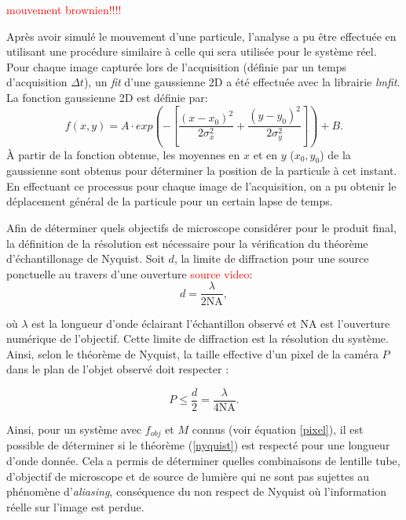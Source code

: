 \documentclass[conference]{IEEEtran}
\begin{document}
\textcolor{red}{mouvement brownien!!!!}

Après avoir simulé le mouvement d'une particule, l'analyse a pu être effectuée en utilisant une procédure similaire
à celle qui sera utilisée pour le système réel. Pour chaque image capturée lors de l'acquisition (définie par un temps d'acquisition $\Delta t$), un \textit{fit}
d'une gaussienne 2D a été effectuée avec la librairie \textit{lmfit}. La fonction gaussienne 2D est définie par:
\begin{equation}
  f(x,y)=A\cdot exp\left(-\left[\frac{(x-x_0)^2}{2\sigma_x^2}+\frac{(y-y_0)^2}{2\sigma_y^2}\right]\right)+B.
\end{equation}
À partir de la fonction obtenue, les moyennes en $x$ et en $y$ ($x_0,y_0$) de la gaussienne sont obtenus
pour déterminer la position de la particule à cet instant. En effectuant ce processus pour chaque image de l'acquisition,
on a pu obtenir le déplacement général de la particule pour un certain lapse de temps.

Afin de déterminer quels objectifs de microscope considérer pour le produit final, la définition
de la résolution est nécessaire pour la vérification du théorème d'échantillonage de Nyquist. Soit $d$,
la limite de diffraction pour une source ponctuelle au travers d'une ouverture \textcolor{red}{source video}:
\begin{equation}
  d = \frac{\lambda}{2 \text{NA}},
\end{equation}

où $\lambda$ est la longueur d'onde éclairant l'échantillon observé et NA est l'ouverture numérique de
l'objectif. Cette limite de diffraction est la résolution du système. Ainsi, selon le théorème
de Nyquist, la taille effective d'un pixel de la caméra $P$ dans le plan de l'objet observé doit respecter :

\begin{equation}\label{nyquist}
  P \leq \frac{d}{2} = \frac{\lambda}{4 \text{NA} }.
\end{equation}


Ainsi, pour un système avec $f_{obj}$ et $M$ connus (voir équation \ref{pixel}), il est possible de déterminer si le théorème 
(\ref{nyquist}) est respecté pour une longueur d'onde donnée. Cela a permis de déterminer quelles 
combinaisons de lentille tube, d'objectif de microscope et de source de lumière qui ne sont pas 
sujettes au phénomène d'\textit{aliasing}, conséquence du non respect de Nyquist où l'information
réelle sur l'image est perdue.
\end{document}
